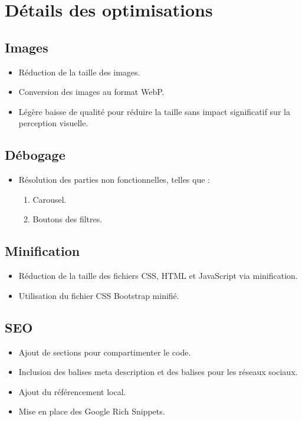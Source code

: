 \newpage
\section{Détails des optimisations}
\subsection{Images}
\begin{itemize}
    \item Réduction de la taille des images.
    \item Conversion des images au format WebP.
    \item Légère baisse de qualité pour réduire la taille sans impact significatif sur la perception visuelle.
\end{itemize}

\subsection{Débogage}
\begin{itemize}
    \item Résolution des parties non fonctionnelles, telles que :
    \begin{enumerate}
        \item Carousel.
        \item Boutons des filtres.
    \end{enumerate}
\end{itemize}

\subsection{Minification}
\begin{itemize}
    \item Réduction de la taille des fichiers CSS, HTML et JavaScript via minification.
    \item Utilisation du fichier CSS Bootstrap minifié.
\end{itemize}

\subsection{SEO}
\begin{itemize}
    \item Ajout de sections pour compartimenter le code.
    \item Inclusion des balises meta description et des balises pour les réseaux sociaux.
    \item Ajout du référencement local.
    \item Mise en place des Google Rich Snippets.
\end{itemize}

